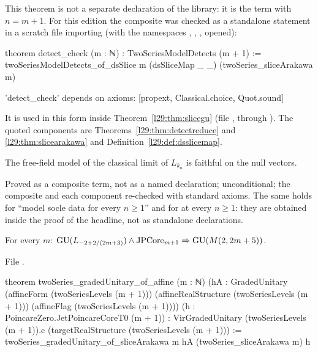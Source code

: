 \noindent This theorem is not a separate declaration of the library: it is the term
 with $n=m+1$. For this edition the composite
was checked as a standalone statement in a scratch file importing  (with the namespaces
, , ,  opened):
\begin{plaincode}
theorem detect_check (m : ℕ) : TwoSeriesModelDetects (m + 1) :=
  twoSeriesModelDetects_of_dsSlice m (dsSliceMap _ _) (twoSeries_sliceArakawa m)

'detect_check' depends on axioms: [propext, Classical.choice, Quot.sound]
\end{plaincode}
\noindent It is used in this form inside Theorem~\ref{l29:thm:slicegu} (file ,
through ). The quoted components are Theorems~\ref{l29:thm:detectreduce} and
\ref{l29:thm:slicearakawa} and Definition~\ref{l29:def:dsslicemap}.

\begin{physics}
The free-field model of the classical limit of $L_{k_n}$ is faithful on the null vectors.
\end{physics}

\begin{status}
Proved as a composite term, not as a named declaration; unconditional; the composite and each component re-checked with
standard axioms. The same holds for ``model socle data for every $n\ge1$'' and for  at every $n\ge1$:
they are obtained inside the proof of the headline, not as standalone declarations.
\end{status}

\begin{theorem}\label{l29:thm:slicegu}
For every $m$: $\mathrm{GU}(L_{-2+2/(2m+3)})\wedge\mathrm{JPCore}_{m+1}\Rightarrow\mathrm{GU}(M(2,2m+5))$.
\end{theorem}

\noindent File .
\begin{leancode}
theorem twoSeries_gradedUnitary_of_affine (m : ℕ)
    (hA : GradedUnitary (affineForm (twoSeriesLevels (m + 1)))
      (affineRealStructure (twoSeriesLevels (m + 1))) (affineFlag (twoSeriesLevels (m + 1))))
    (h : PoincareZero.JetPoincareCoreT0 (m + 1)) :
    VirGradedUnitary (twoSeriesLevels (m + 1)).c (targetRealStructure (twoSeriesLevels (m + 1))) :=
  twoSeries_gradedUnitary_of_sliceArakawa m hA (twoSeries_sliceArakawa m) h
\end{leancode}

